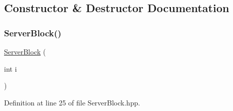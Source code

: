 \subsection{Constructor \& Destructor Documentation}
\mbox{\label{classft_1_1_server_block_a592b14cd2e97683f3997e666c41e5009}} 
\subsubsection{\texorpdfstring{Server\+Block()}{ServerBlock()}\hspace{0.1cm}{\footnotesize\ttfamily [1/2]}}
{\footnotesize\ttfamily \hyperlink{classft_1_1_server_block}{Server\+Block} (\begin{DoxyParamCaption}\item[{int}]{i }\end{DoxyParamCaption})\hspace{0.3cm}{\ttfamily [inline]}}



Definition at line 25 of file Server\+Block.\+hpp.


